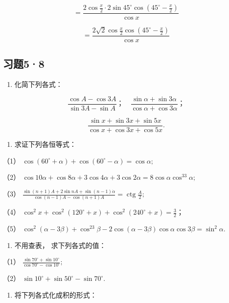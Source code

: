 \[
= \frac {2 \cos \frac {x}{2} \cdot 2 \sin 45 ^{\circ} \cos \left(45 ^{\circ} - \frac {x}{2}\right)}{\cos x}
\]

\[
= \frac {2 \sqrt {2} \cos \frac {x}{2} \cos \left(45 ^{\circ} - \frac {x}{2}\right)}{\cos x}
\]

\subsection{习题5·8}

\begin{enumerate}
\item
  化简下列各式：
\end{enumerate}

\[
\frac {\cos A - \cos 3 A}{\sin 3 A - \sin A}\text{；} \quad \frac {\sin \alpha + \sin 3 \alpha}{\cos \alpha + \cos 3 \alpha}\text{；} \tag {1}
\]

\[
\frac {\sin x + \sin 3 x + \sin 5 x}{\cos x + \cos 3 x + \cos 5 x}. \tag {3}
\]

\begin{enumerate}[start=2]
\item
  求证下列各恒等式：
\end{enumerate}

（1）
\(\cos (60^{\circ} + \alpha) + \cos (60^{\circ} - \alpha) = \cos \alpha;\)

（2）
\(\cos 10\alpha + \cos 8\alpha + 3\cos 4\alpha + 3\cos 2\alpha = 8\cos \alpha \cos^33\alpha;\)

（3）
\(\frac{\sin(n+1)A+2\sin nA+\sin(n-1)\dot{\alpha}}{\cos(n-1)A-\cos(n+1)A}=\operatorname{ctg}\frac{A}{2};\)

（4）
\(\cos^2 x + \cos^2 (120^\circ + x) + \cos^2 (240^\circ + x) = \frac{3}{2}\)；

（5）
\(\cos^2 (\alpha - 3\beta) + \cos^23\beta - 2\cos (\alpha - 3\beta)\cos \alpha \cos 3\beta = \sin^2\alpha.\)

\begin{enumerate}[start=3]
\item
  不用查表， 求下列各式的值：
\end{enumerate}

（1）
\(\frac{\sin 70^{\circ} + \sin 10^{\circ}}{\cos 70^{\circ} - \cos 10^{\circ}};\)

（2） \(\sin 10^{\circ} + \sin 50^{\circ} - \sin 70^{\circ}\).

\begin{enumerate}[start=4]
\item
  将下列各式化成积的形式：
\end{enumerate}

